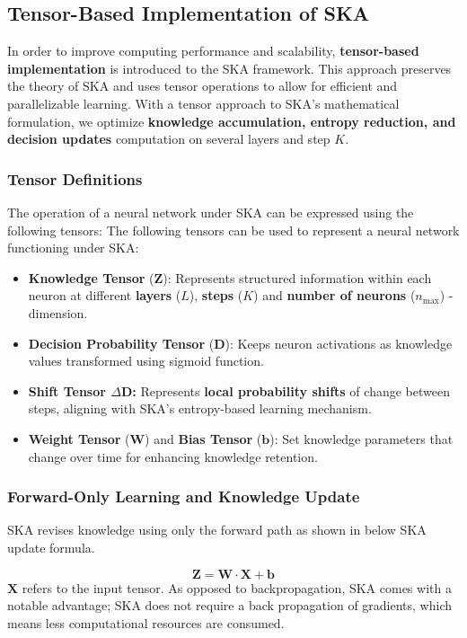 \documentclass{article}
\begin{document}
\subsection{Tensor-Based Implementation of SKA}

In order to improve computing performance and scalability, \textbf{tensor-based implementation} is introduced to the SKA framework. This approach preserves the theory of SKA and uses tensor operations to allow for efficient and parallelizable learning. With a tensor approach to SKA's mathematical formulation, we optimize \textbf{knowledge accumulation, entropy reduction, and decision updates} computation on several layers and step $K$.

\subsubsection*{Tensor Definitions}
The operation of a neural network under SKA can be expressed using the following tensors: 
The following tensors can be used to represent a neural network functioning under SKA:

\begin{itemize}
	\item \textbf{Knowledge Tensor} ($\mathbf{Z}$): Represents structured information within each neuron at different \textbf{layers} ($L$), \textbf{steps} ($K$) and \textbf{number of neurons} ($n_{\text{max}}$) -dimension.

	\item \textbf{Decision Probability Tensor} ($\mathbf{D}$): Keeps neuron activations as knowledge values transformed using sigmoid function.
	\item \textbf{Shift Tensor \(\Delta \mathbf{D}\):} Represents \textbf{local probability shifts} of change between steps, aligning with SKA’s entropy-based learning mechanism.

	\item \textbf{Weight Tensor} ($\mathbf{W}$) and \textbf{Bias Tensor} ($\mathbf{b}$): Set knowledge parameters that change over time for enhancing knowledge retention.
\end{itemize}
\subsubsection*{Forward-Only Learning and Knowledge Update}
SKA revises knowledge using only the forward path as shown in below SKA update formula. 

\[
\mathbf{Z} = \mathbf{W} \cdot \mathbf{X} + \mathbf{b}
\]
\noindent \textbf{\textit{$\mathbf{X}$}} refers to the input tensor. As opposed to backpropagation, SKA comes with a notable advantage; SKA does not require a back propagation of gradients, which means less computational resources are consumed.
\end{document}
